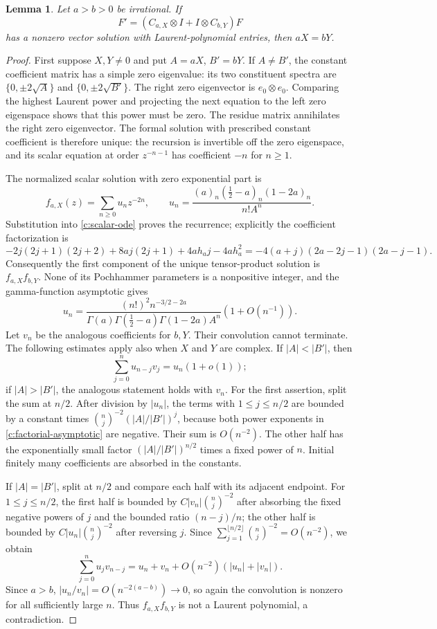\documentclass[11pt,a4paper]{article}
\numberwithin{equation}{section}
\newtheorem{lemma}[theorem]{Lemma}
\theoremstyle{definition}\newtheorem{definition}[theorem]{Definition}
\theoremstyle{remark}\newtheorem{remark}[theorem]{Remark}
\begin{document}
\begin{lemma}\label{c:laurent-obstruction}
Let $a>b>0$ be irrational. If
\[
 F'=(C_{a,X}\otimes I+I\otimes C_{b,Y})F
\]
has a nonzero vector solution with Laurent-polynomial entries, then $aX=bY$.
\end{lemma}
\begin{proof}
First suppose $X,Y\ne0$ and put $A=aX$, $B'=bY$. If $A\ne B'$, the constant coefficient matrix has a simple zero eigenvalue: its two constituent spectra are $\{0,\pm2\sqrt A\}$ and $\{0,\pm2\sqrt{B'}\}$. The right zero eigenvector is $e_0\otimes e_0$. Comparing the highest Laurent power and projecting the next equation to the left zero eigenspace shows that this power must be zero. The residue matrix annihilates the right zero eigenvector. The formal solution with prescribed constant coefficient is therefore unique: the recursion is invertible off the zero eigenspace, and its scalar equation at order $z^{-n-1}$ has coefficient $-n$ for $n\ge1$.

The normalized scalar solution with zero exponential part is
\[
 f_{a,X}(z)=\sum_{n\ge0}u_nz^{-2n},\qquad
 u_n=\frac{(a)_n(\tfrac12-a)_n(1-2a)_n}{n!A^n}.
\]
Substitution into \eqref{c:scalar-ode} proves the recurrence; explicitly the coefficient factorization is
\[
 -2j(2j+1)(2j+2)+8aj(2j+1)+4ah_aj-4ah_a^2
 =-4(a+j)(2a-2j-1)(2a-j-1).
\]
Consequently the first component of the unique tensor-product solution is $f_{a,X}f_{b,Y}$. None of its Pochhammer parameters is a nonpositive integer, and the gamma-function asymptotic gives
\begin{equation}\label{c:factorial-asymptotic}
 u_n=\frac{(n!)^2 n^{-3/2-2a}}{\Gamma(a)\Gamma(\tfrac12-a)\Gamma(1-2a)A^n}
       (1+O(n^{-1})).
\end{equation}
Let $v_n$ be the analogous coefficients for $b,Y$. Their convolution cannot terminate. The following estimates apply also when $X$ and $Y$ are complex. If $|A|<|B'|$, then
\[
 \sum_{j=0}^n u_{n-j}v_j=u_n(1+o(1));
\]
if $|A|>|B'|$, the analogous statement holds with $v_n$. For the first assertion,
split the sum at $n/2$. After division by $|u_n|$, the terms with $1\le j\le n/2$ are bounded by a constant times $\binom nj^{-2}(|A|/|B'|)^j$, because both power exponents in \eqref{c:factorial-asymptotic} are negative. Their sum is $O(n^{-2})$. The other half has the exponentially small factor $(|A|/|B'|)^{n/2}$ times a fixed power of $n$. Initial finitely many coefficients are absorbed in the constants.

If $|A|=|B'|$, split at $n/2$ and compare each half with its adjacent
endpoint. For $1\le j\le n/2$, the first half is bounded by
$C|v_n|\binom nj^{-2}$ after absorbing the fixed negative powers
of $j$ and the bounded ratio $(n-j)/n$; the other half is bounded
by $C|u_n|\binom nj^{-2}$ after reversing $j$.
Since $\sum_{j=1}^{\lfloor n/2\rfloor}\binom nj^{-2}=O(n^{-2})$,
we obtain
\[
 \sum_{j=0}^n u_jv_{n-j}=u_n+v_n+
 O(n^{-2})(|u_n|+|v_n|).
\]
Since $a>b$, $|u_n/v_n|=O(n^{-2(a-b)})\to0$, so again the convolution is nonzero for all sufficiently large $n$. Thus $f_{a,X}f_{b,Y}$ is not a Laurent polynomial, a contradiction.


\end{proof}
\end{document}
